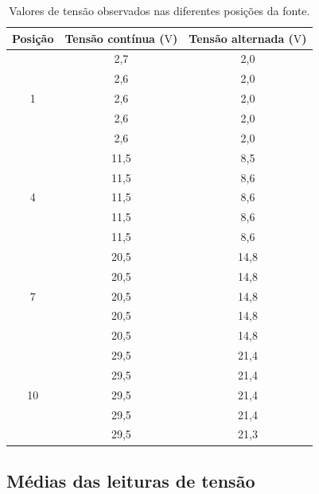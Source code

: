 \documentclass[a4paper,12pt]{article}
\begin{document}
\begin{table}[H]
  \centering
  \caption{Valores de tensão observados nas diferentes posições da fonte.}
  \label{tab:medicoes_tensao}
  \medskip

  \begin{tabular}{ccc}
    \toprule
    {\textbf{Posição}}
    & {\textbf{Tensão contínua} ($\mathrm{V}$)}
    & {\textbf{Tensão alternada} ($\mathrm{V}$)} \\
    \midrule
    \multirow{5}{*}{1}
      & 2,7  & 2,0 \\
      & 2,6  & 2,0 \\
      & 2,6  & 2,0 \\
      & 2,6  & 2,0 \\
      & 2,6  & 2,0 \\
    \midrule
    \multirow{5}{*}{4}
      & 11,5 & 8,5 \\
      & 11,5 & 8,6 \\
      & 11,5 & 8,6 \\
      & 11,5 & 8,6 \\
      & 11,5 & 8,6 \\
    \midrule
    \multirow{5}{*}{7}
      & 20,5 & 14,8 \\
      & 20,5 & 14,8 \\
      & 20,5 & 14,8 \\
      & 20,5 & 14,8 \\
      & 20,5 & 14,8 \\
    \midrule
    \multirow{5}{*}{10}
      & 29,5 & 21,4 \\
      & 29,5 & 21,4 \\
      & 29,5 & 21,4 \\
      & 29,5 & 21,4 \\
      & 29,5 & 21,3 \\
    \bottomrule
  \end{tabular}
\end{table}

\subsection{Médias das leituras de tensão}
\end{document}

